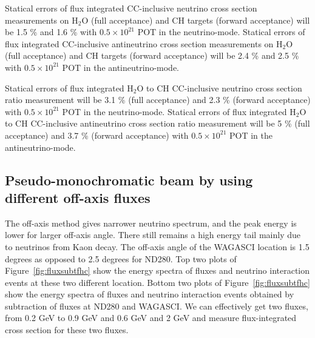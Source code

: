 Statical errors of flux integrated CC-inclusive neutrino cross section measurements on H$_{2}$O (full acceptance) and CH targets (forward acceptance)
will be 1.5 \% and 1.6 \% with $0.5\times 10^{21}$ POT in the neutrino-mode.
Statical errors of flux integrated CC-inclusive antineutrino cross section measurements on H$_{2}$O (full acceptance) and CH targets (forward acceptance)
will be 2.4 \% and 2.5 \% with $0.5\times 10^{21}$ POT in the antineutrino-mode.


Statical errors of flux integrated H$_{2}$O to CH CC-inclusive neutrino cross section ratio measurement 
will be 3.1 \% (full acceptance) and 2.3 \% (forward acceptance) with $0.5\times 10^{21}$ POT in the neutrino-mode.
Statical errors of flux integrated H$_{2}$O to CH CC-inclusive antineutrino cross section ratio measurement will be 5 \% (full acceptance) and 3.7 \% (forward acceptance) with $0.5\times 10^{21}$ POT in the antineutrino-mode.


\subsection{Pseudo-monochromatic beam by using different off-axis fluxes}
The off-axis method gives narrower neutrino spectrum, and the peak energy is lower for larger off-axis angle.
There still remains a high energy tail mainly due to neutrinos from Kaon decay.
The off-axis angle of the WAGASCI location is 1.5 degrees as opposed to
2.5 degrees for ND280.
Top two plots of Figure~\ref{fig:fluxsubtfhc} show the energy spectra of fluxes and neutrino interaction events at these two different location.
Bottom two plots of Figure~\ref{fig:fluxsubtfhc} show the energy spectra of fluxes and neutrino interaction events obtained by subtraction of fluxes at ND280 and WAGASCI.
We can effectively get two fluxes, from 0.2 GeV to 0.9 GeV and 0.6 GeV and 2 GeV
and measure flux-integrated cross section for these two fluxes.

